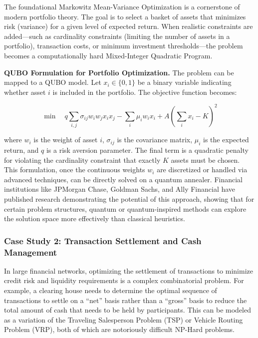 \documentclass[11pt,a4paper]{article}
\begin{document}
The foundational Markowitz Mean-Variance Optimization is a cornerstone of modern portfolio theory. The goal is to select a basket of assets that minimizes risk (variance) for a given level of expected return. When realistic constraints are added---such as cardinality constraints (limiting the number of assets in a portfolio), transaction costs, or minimum investment thresholds---the problem becomes a computationally hard Mixed-Integer Quadratic Program.

\textbf{QUBO Formulation for Portfolio Optimization.} The problem can be mapped to a QUBO model. Let $x_i \in \{0, 1\}$ be a binary variable indicating whether asset $i$ is included in the portfolio. The objective function becomes:

\begin{equation}
    \min \quad q \sum_{i,j} \sigma_{ij} w_i w_j x_i x_j - \sum_i \mu_i w_i x_i + A \left( \sum_i x_i - K \right)^2
    \label{eq:portfolio}
\end{equation}

where $w_i$ is the weight of asset $i$, $\sigma_{ij}$ is the covariance matrix, $\mu_i$ is the expected return, and $q$ is a risk aversion parameter. The final term is a quadratic penalty for violating the cardinality constraint that exactly $K$ assets must be chosen. This formulation, once the continuous weights $w_i$ are discretized or handled via advanced techniques, can be directly solved on a quantum annealer. Financial institutions like JPMorgan Chase, Goldman Sachs, and Ally Financial have published research demonstrating the potential of this approach, showing that for certain problem structures, quantum or quantum-inspired methods can explore the solution space more effectively than classical heuristics.

\subsubsection{Case Study 2: Transaction Settlement and Cash Management}

In large financial networks, optimizing the settlement of transactions to minimize credit risk and liquidity requirements is a complex combinatorial problem. For example, a clearing house needs to determine the optimal sequence of transactions to settle on a ``net'' basis rather than a ``gross'' basis to reduce the total amount of cash that needs to be held by participants. This can be modeled as a variation of the Traveling Salesperson Problem (TSP) or Vehicle Routing Problem (VRP), both of which are notoriously difficult NP-Hard problems.
\end{document}
